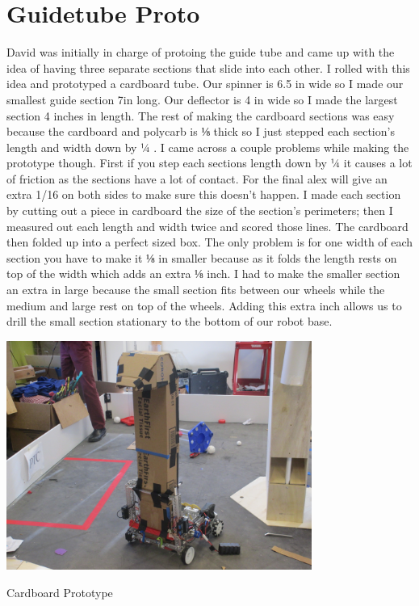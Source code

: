 \section*{Guidetube Proto}
David was initially in charge of protoing the guide tube and came up with the idea of having three separate sections that slide into each other. I rolled with this idea and prototyped a cardboard tube. Our spinner is 6.5 in wide so I made our smallest guide section 7in long. Our deflector is 4 in wide so I made the largest section 4 inches in length. The rest of making the cardboard sections was easy because the cardboard and polycarb is ⅛ thick so I just stepped each section’s length and width down by ¼ . I came across a couple problems while making the prototype though. First if you step each sections length down by ¼ it causes a lot of friction as the sections have a lot of contact. For the final alex will give an extra 1/16 on both sides to make sure this doesn’t happen. I made each section by cutting out a piece in cardboard the size of the section’s perimeters; then I measured out each length and width twice and scored those lines. The cardboard then folded up into a perfect sized box. The only problem is for one width of each section you have to make it ⅛ in smaller because as it folds the length rests on top of the width which adds an extra ⅛ inch. I had to make the smaller section an extra in large because the small section fits between our wheels while the medium and large rest on top of the wheels. Adding this extra inch allows us to drill the small section stationary to the bottom of our robot base.

\begin{center}
\includegraphics[width=10cm]{./Entries/Images/CardboardProto.jpg}
\end{center}

Cardboard Prototype

